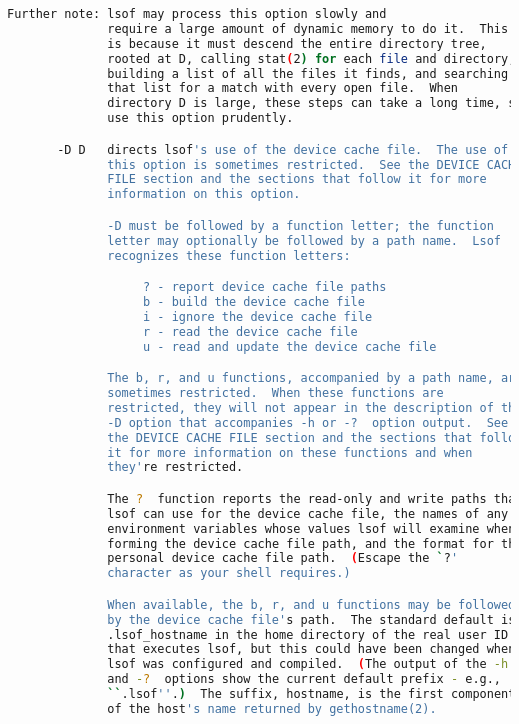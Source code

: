 {{\begin{lstlisting}[language=bash]
              Further note: lsof may process this option slowly and
              require a large amount of dynamic memory to do it.  This
              is because it must descend the entire directory tree,
              rooted at D, calling stat(2) for each file and directory,
              building a list of all the files it finds, and searching
              that list for a match with every open file.  When
              directory D is large, these steps can take a long time, so
              use this option prudently.

       -D D   directs lsof's use of the device cache file.  The use of
              this option is sometimes restricted.  See the DEVICE CACHE
              FILE section and the sections that follow it for more
              information on this option.

              -D must be followed by a function letter; the function
              letter may optionally be followed by a path name.  Lsof
              recognizes these function letters:

                   ? - report device cache file paths
                   b - build the device cache file
                   i - ignore the device cache file
                   r - read the device cache file
                   u - read and update the device cache file

              The b, r, and u functions, accompanied by a path name, are
              sometimes restricted.  When these functions are
              restricted, they will not appear in the description of the
              -D option that accompanies -h or -?  option output.  See
              the DEVICE CACHE FILE section and the sections that follow
              it for more information on these functions and when
              they're restricted.

              The ?  function reports the read-only and write paths that
              lsof can use for the device cache file, the names of any
              environment variables whose values lsof will examine when
              forming the device cache file path, and the format for the
              personal device cache file path.  (Escape the `?'
              character as your shell requires.)

              When available, the b, r, and u functions may be followed
              by the device cache file's path.  The standard default is
              .lsof_hostname in the home directory of the real user ID
              that executes lsof, but this could have been changed when
              lsof was configured and compiled.  (The output of the -h
              and -?  options show the current default prefix - e.g.,
              ``.lsof''.)  The suffix, hostname, is the first component
              of the host's name returned by gethostname(2).


\end{lstlisting}}}
